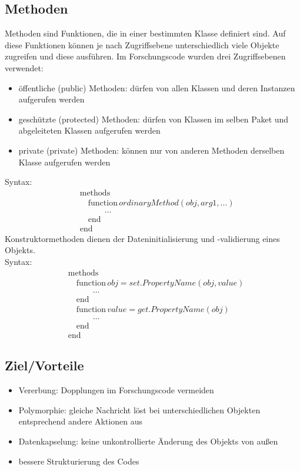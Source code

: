\documentclass[12pt,bibstyle=none,pagenumberinfooter]{ifmdocument}
\begin{document}
	\subsection{Methoden}
	Methoden sind Funktionen, die in einer bestimmten Klasse definiert sind. Auf diese Funktionen k\"onnen je nach Zugriffsebene unterschiedlich viele Objekte zugreifen und diese ausführen. 
	Im Forschungscode wurden drei Zugriffsebenen verwendet: 
	\begin{itemize}
		\item \"offentliche (public) Methoden: d\"urfen von allen Klassen und deren Instanzen aufgerufen werden
		\item gesch\"utzte (protected) Methoden: d\"urfen von Klassen im selben Paket und abgeleiteten Klassen aufgerufen werden
		\item private (private) Methoden: k\"onnen nur von anderen Methoden derselben Klasse aufgerufen werden 
	\end{itemize}
Syntax:
	\begin{align*}
		&\text{methods} \\\
		&\quad\text{function} \, ordinaryMethod(obj,arg1,...) \\
		&\quad \qquad \ldots \\
		&\quad\text{end} \\
		&\text{end}	
	\end{align*}
Konstruktormethoden dienen der Dateninitialisierung und -validierung eines Objekts.\\
Syntax:
	\begin{align*}
		&\text{methods} \\
		&\quad\text{function}\, obj = set.PropertyName(obj,value) \\
		&\quad \qquad \ldots \\               
		&\quad\text{end} \\
		&\quad\text{function}\, value = get.PropertyName(obj)\\
		&\quad \qquad\ldots \\
		&\quad\text{end}\\
		&\text{end}	
	\end{align*}

	\subsection{Ziel/Vorteile}
	\begin{itemize}
		\item Vererbung: Dopplungen im Forschungscode vermeiden
		\item Polymorphie: gleiche Nachricht l\"ost bei unterschiedlichen Objekten entsprechend andere Aktionen aus 
		\item Datenkapselung: keine unkontrollierte \"Anderung des Objekts von außen
		\item bessere Strukturierung des Codes
	\end{itemize}
	
\end{document}
